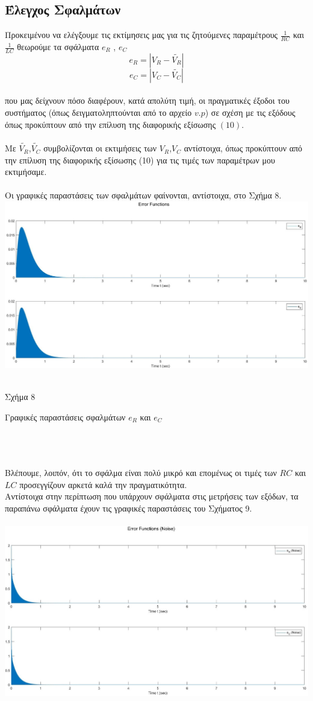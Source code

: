 \documentclass[12pt]{article}
\begin{document}
\subsection{Έλεγχος Σφαλμάτων}
Προκειμένου να ελέγξουμε τις εκτίμησεις μας για τις ζητούμενες παραμέτρους $\frac{1}{RC}$ και $\frac{1}{LC}$ θεωρούμε τα σφάλματα  $e_{R}$ , $e_{C}$
\[e_{R}=|V_{R} - \widetilde{V_{R}}|\]
\[e_{C}=|V_{C} - \widetilde{V_{C}}| \]
\\
που μας δείχνουν πόσο διαφέρουν, κατά απολύτη τιμή,  οι πραγματικές έξοδοι του συστήματος (όπως δειγματοληπτούνται από το αρχείο $v.p$) σε σχέση με τις εξόδους όπως προκύπτουν από την επίλυση της διαφορικής εξίσωσης $(10)$.
\\ \\
Με $\widetilde{V_{R}}$,$\widetilde{V_{C}}$ συμβολίζονται οι εκτιμήσεις των $V_{R}$,$V_{C}$ αντίστοιχα, όπως προκύπτουν από την επίλυση της διαφορικής εξίσωσης (10) για τις τιμές των παραμέτρων μου εκτιμήσαμε.
\\ \\
Οι γραφικές παραστάσεις των σφαλμάτων φαίνονται, αντίστοιχα, στο Σχήμα 8.
\includegraphics[width=\linewidth]{sys2_error.jpg}
\\ \\
\centerline{Σχήμα 8}
\centerline{Γραφικές παραστάσεις σφαλμάτων $e_{R}$ και $e_{C}$}
\\ \\ \\
Βλέπουμε, λοιπόν, ότι το σφάλμα είναι πολύ μικρό και επομένως οι τιμές των $RC$ και $LC$ προσεγγίζουν αρκετά καλά την πραγματικότητα.
\\
Αντίστοιχα στην περίπτωση που υπάρχουν σφάλματα στις μετρήσεις των εξόδων, τα παραπάνω σφάλματα έχουν τις γραφικές παραστάσεις του Σχήματος 9.
\\ \\
\includegraphics[width=\linewidth]{sys2_error_noise.jpg}
\end{document}
